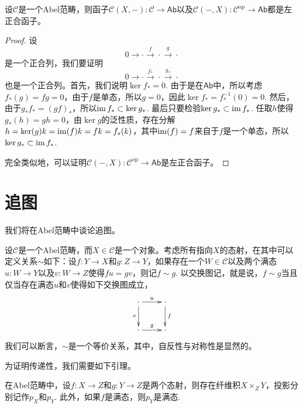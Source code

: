 \begin{pro}
设$\mathcal{C}$是一个Abel范畴，则函子$\mathcal{C}(X,-):\mathcal{C}\to \mathsf{Ab}$以及$\mathcal{C}(-,X):\mathcal{C}^\mathrm{op} \to \mathsf{Ab}$都是左正合函子。
\end{pro}

\begin{proof}
	设
	\[
		0\to\cdot \xrightarrow{f}\cdot \xrightarrow{g}\cdot
	\]
	是一个正合列，我们要证明
	\[
	0\to \cdot \xrightarrow{f_*}\cdot \xrightarrow{g_*}\cdot
	\]
	也是一个正合列。首先，我们说明$\ker f_*=0$. 由于是在$\mathsf{Ab}$中，所以考虑$f_*(g)=fg=0$，由于$f$是单态，所以$g=0$，因此$\ker f_*=f_*^{-1}(0)=0$. 然后，由于$g_*f_*=(gf)_*$，所以$\operatorname{im} f_*\subset \ker g_*$. 最后只要检验$\ker g_*\subset \operatorname{im} f_*$. 任取$h$使得$g_*(h)=gh=0$，由$\ker g$的泛性质，存在分解$h=\ker(g)k=\operatorname{im}(f)k=fk=f_*(k)$，其中$\operatorname{im}(f)=f$来自于$f$是一个单态，所以$\ker g_* \subset \operatorname{im} f_*$.

	完全类似地，可以证明$\mathcal{C}(-,X):\mathcal{C}^\text{op} \to \mathsf{Ab}$是左正合函子。
\end{proof}

\section{追图}

我们将在Abel范畴中谈论追图。

\begin{lem}\label{zhuitu}
设$\mathcal{C}$是一个Abel范畴，而$X\in \mathcal{C}$是一个对象。考虑所有指向$X$的态射，在其中可以定义关系$\sim$如下：设$f:Y\to X$和$g:Z\to Y$，如果存在一个$W\in \mathcal{C}$以及两个满态$u:W\to Y$以及$v:W\to Z$使得$fu=gv$，则记$f\sim g$. 以交换图记，就是说，$f\sim g$当且仅当存在满态$u$和$v$使得如下交换图成立，
\[
\xymatrix{
	\cdot \ar[r]^u \ar[d]_v & \cdot\ar[d]^f\\
	\cdot \ar[r]^g & \cdot
}
\]
我们可以断言，$\sim$是一个等价关系，其中，自反性与对称性是显然的。
\end{lem}

为证明传递性，我们需要如下引理。

\begin{lem}\label{mt}
	在Abel范畴中，设$f:X\to Z$和$g:Y\to Z$是两个态射，则存在纤维积$X\times_Z Y$，投影分别记作$p_X$和$p_Y$. 此外，如果$f$是满态，则$p_Y$是满态.
\end{lem}


